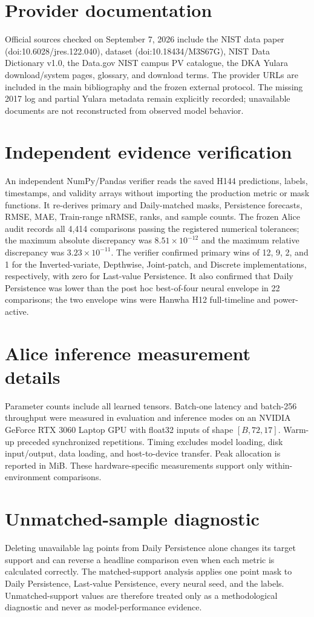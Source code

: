 \section{Provider documentation}
Official sources checked on September 7, 2026 include the NIST data paper (doi:10.6028/jres.122.040), dataset (doi:10.18434/M3S67G), NIST Data Dictionary v1.0, the Data.gov NIST campus PV catalogue, the DKA Yulara download/system pages, glossary, and download terms. The provider URLs are included in the main bibliography and the frozen external protocol. The missing 2017 log and partial Yulara metadata remain explicitly recorded; unavailable documents are not reconstructed from observed model behavior.



\section{Independent evidence verification}
An independent NumPy/Pandas verifier reads the saved H144 predictions, labels, timestamps, and validity arrays without importing the production metric or mask functions. It re-derives primary and Daily-matched masks, Persistence forecasts, RMSE, MAE, Train-range nRMSE, ranks, and sample counts. The frozen Alice audit records all 4,414 comparisons passing the registered numerical tolerances; the maximum absolute discrepancy was $8.51\times10^{-12}$ and the maximum relative discrepancy was $3.23\times10^{-11}$. The verifier confirmed primary wins of 12, 9, 2, and 1 for the Inverted-variate, Depthwise, Joint-patch, and Discrete implementations, respectively, with zero for Last-value Persistence. It also confirmed that Daily Persistence was lower than the post hoc best-of-four neural envelope in 22 comparisons; the two envelope wins were Hanwha H12 full-timeline and power-active.




\section{Alice inference measurement details}
Parameter counts include all learned tensors. Batch-one latency and batch-256 throughput were measured in evaluation and inference modes on an NVIDIA GeForce RTX 3060 Laptop GPU with float32 inputs of shape $[B,72,17]$. Warm-up preceded synchronized repetitions. Timing excludes model loading, disk input/output, data loading, and host-to-device transfer. Peak allocation is reported in MiB. These hardware-specific measurements support only within-environment comparisons.

\section{Unmatched-sample diagnostic}
Deleting unavailable lag points from Daily Persistence alone changes its target support and can reverse a headline comparison even when each metric is calculated correctly. The matched-support analysis applies one point mask to Daily Persistence, Last-value Persistence, every neural seed, and the labels. Unmatched-support values are therefore treated only as a methodological diagnostic and never as model-performance evidence.
